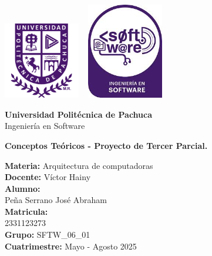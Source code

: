 \documentclass[a4paper,12pt]{article}
\begin{document}
	\begin{titlepage}
		\centering
		\includegraphics[width=0.25\textwidth]{logoUpp} \hspace{7cm} 
		\includegraphics[width=0.25\textwidth]{logoSftw}
		\vspace{2cm}
		
		\Huge \textbf{Universidad Politécnica de Pachuca}\\
		\vspace{0.5cm}
		\Large Ingeniería en Software
		\vspace{1cm}
		
		\Huge \textbf{Conceptos Teóricos - Proyecto de Tercer Parcial.}
		\vspace{1cm}
		
		\Large \textbf{Materia:} Arquitectura de computadoras \\
		\Large \textbf{Docente:} Víctor Hainy\\
		\vspace{1cm}
		\Large \textbf{Alumno:} \\Peña Serrano José Abraham\\
		\vspace{1cm}
		\Large \textbf{Matricula:} \\2331123273\\
		\vspace{1cm}
		\Large \textbf{Grupo:} SFTW\_06\_01\\
		\vspace{1cm}
		\Large \textbf{Cuatrimestre:} Mayo - Agosto 2025
		
	\end{titlepage}
	
\end{document}
